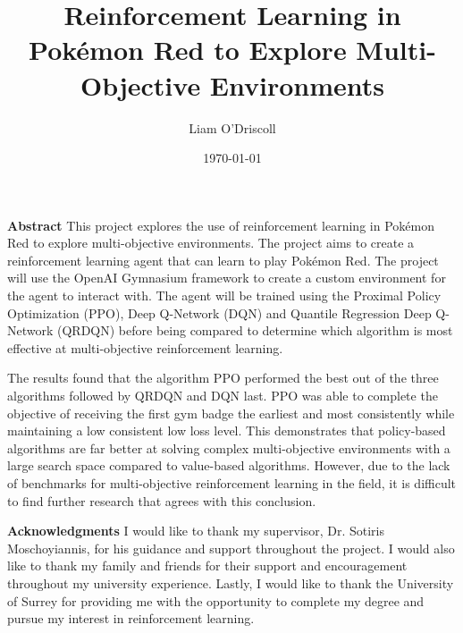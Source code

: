 \documentclass[11pt]{surrey_disso_style}
\title{Reinforcement Learning in Pokémon Red to Explore Multi-Objective Environments}
\author{Liam O'Driscoll}
\date{\today}
\begin{document}
\maketitle


\noindent\LARGE\textbf{Abstract}
\normalsize
\vspace{0.5cm}
\newline
This project explores the use of reinforcement learning in Pokémon Red to explore multi-objective environments. The project aims to create a reinforcement learning agent that can learn to play Pokémon Red. The project will use the OpenAI Gymnasium framework to create a custom environment for the agent to interact with. The agent will be trained using the Proximal Policy Optimization (PPO), Deep Q-Network (DQN) and Quantile Regression Deep Q-Network (QRDQN) before being compared to determine which algorithm is most effective at multi-objective reinforcement learning. 

The results found that the algorithm PPO performed the best out of the three algorithms followed by QRDQN and DQN last. PPO was able to complete the objective of receiving the first gym badge the earliest and most consistently while maintaining a low consistent low loss level. This demonstrates that policy-based algorithms are far better at solving complex multi-objective environments with a large search space compared to value-based algorithms. However, due to the lack of benchmarks for multi-objective reinforcement learning in the field, it is difficult to find further research that agrees with this conclusion.

\vspace{0.5cm}
\noindent\LARGE\textbf{Acknowledgments}
\normalsize
\vspace{0.5cm}
\newline
I would like to thank my supervisor, Dr. Sotiris Moschoyiannis, for his guidance and support throughout the project. I would also like to thank my family and friends for their support and encouragement throughout my university experience. Lastly, I would like to thank the University of Surrey for providing me with the opportunity to complete my degree and pursue my interest in reinforcement learning.

\newpage

\tableofcontents











\end{document}

